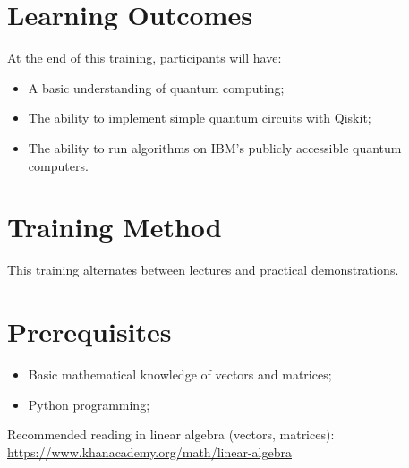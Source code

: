 \documentclass[11pt]{article}
\begin{document}
\section*{Learning Outcomes}

At the end of this training, participants will have:

\begin{itemize}[leftmargin=*,itemsep=0.4em]
\item A basic understanding of quantum computing;
\item The ability to implement simple quantum circuits with Qiskit;
\item The ability to run algorithms on IBM's publicly accessible quantum computers.
\end{itemize}

\section*{Training Method}

This training alternates between lectures and practical demonstrations.

\section*{Prerequisites}

\begin{itemize}[leftmargin=*,itemsep=0.4em]
\item Basic mathematical knowledge of vectors and matrices;
\item Python programming;
\end{itemize}

Recommended reading in linear algebra (vectors, matrices):
\url{https://www.khanacademy.org/math/linear-algebra}
\end{document}
